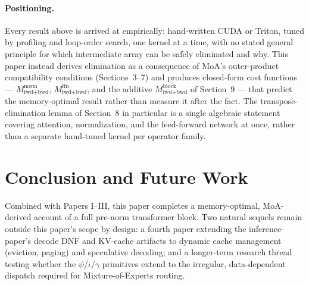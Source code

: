 \documentclass[11pt]{article}
\newcommand{\psii}{\psi}
\newcommand{\iotaop}{\iota}
\newcommand{\gammaop}{\gamma}
\theoremstyle{definition}
\begin{document}
\paragraph{Positioning.} Every result above is arrived at empirically:
hand-written CUDA or Triton, tuned by profiling and loop-order search,
one kernel at a time, with no stated general principle for which
intermediate array can be safely eliminated and why. This paper instead
derives elimination as a consequence of MoA's outer-product
compatibility conditions (Sections~3--7) and produces closed-form cost
functions --- $M^{\mathrm{norm}}_{\text{fwd+bwd}}$,
$M^{\mathrm{ffn}}_{\text{fwd+bwd}}$, and the additive
$M^{\mathrm{block}}_{\text{fwd+bwd}}$ of Section~9 --- that predict the
memory-optimal result rather than measure it after the fact. The
transpose-elimination lemma of Section~8 in particular is a single
algebraic statement covering attention, normalization, and the
feed-forward network at once, rather than a separate hand-tuned kernel
per operator family.

\section{Conclusion and Future Work}

Combined with Papers I--III, this paper completes a memory-optimal,
MoA-derived account of a full pre-norm transformer block. Two natural
sequels remain outside this paper's scope by design: a fourth paper
extending the inference-paper's decode DNF and KV-cache artifacts to
dynamic cache management (eviction, paging) and speculative decoding;
and a longer-term research thread testing whether the $\psii$/$\iotaop$/$\gammaop$
primitives extend to the irregular, data-dependent dispatch required for
Mixture-of-Experts routing.



\end{document}
